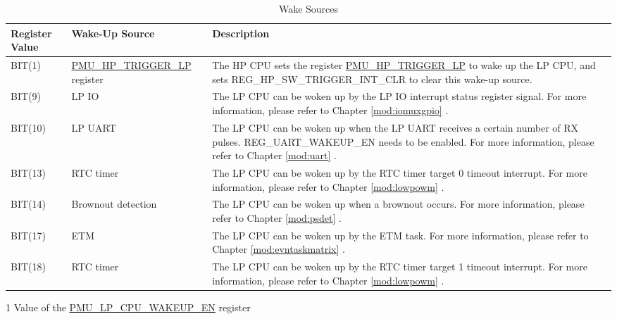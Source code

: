 \documentclass[main\_\_EN.tex]{subfiles}
\begin{document}
    \begin{table}[H]
    \centering
    \caption{Wake Sources}
    \label{tab:ulp-wake-sources}
    \begin{threeparttable}
    \begin{tabular}{| l | l | m{9cm}|}
    \hline
    \rowcolor{lightgray}
    Register Value \tnote{1} & Wake-Up Source & Description  \\\hline
    BIT(1)  & \hyperref[fielddesc:PMUHPTRIGGERLP]{PMU\_HP\_TRIGGER\_LP} register & The HP CPU sets the register \hyperref[fielddesc:PMUHPTRIGGERLP]{PMU\_HP\_TRIGGER\_LP} to wake up the LP CPU, and sets REG\_HP\_SW\_TRIGGER\_INT\_CLR to clear this wake-up source. \\\hline
    BIT(9)  & LP IO & The LP CPU can be woken up by the LP IO interrupt status register signal. For more information, please refer to Chapter \ref{mod:iomuxgpio} \textit{\nameref{mod:iomuxgpio}}. \\\hline
    BIT(10)  & LP UART & The LP CPU can be woken up when the LP UART receives a certain number of RX pulses. REG\_UART\_WAKEUP\_EN needs to be enabled. For more information, please refer to Chapter \ref{mod:uart} \textit{\nameref{mod:uart}}. \\\hline
    BIT(13) & RTC timer & The LP CPU can be woken up by the RTC timer target 0 timeout interrupt. For more information, please refer to Chapter \ref{mod:lowpowm} \textit{\nameref{mod:lowpowm}}. \\\hline
    BIT(14) & Brownout detection & The LP CPU can be woken up when a brownout occurs. For more information, please refer to Chapter \ref{mod:psdet} \textit{\nameref{mod:psdet}}. \\\hline
    BIT(17)  & ETM &  The LP CPU can be woken up by the ETM task. For more information, please refer to Chapter \ref{mod:evntaskmatrix} \textit{\nameref{mod:evntaskmatrix}}. \\\hline
    BIT(18) & RTC timer & The LP CPU can be woken up by the RTC timer target 1 timeout interrupt. For more information, please refer to Chapter \ref{mod:lowpowm} \textit{\nameref{mod:lowpowm}}. \\\hline


\end{tabular}
    \begin{tablenotes}
        \item[1] Value of the \hyperref[fielddesc:PMULPCPUWAKEUPEN]{PMU\_LP\_CPU\_WAKEUP\_EN} register
    \end{tablenotes}
    \end{threeparttable}
\end{table}
\end{document}
